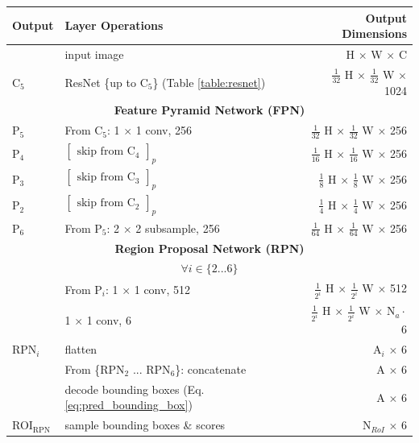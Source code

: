 {
\begin{table}[h]
\centering
\begin{tabular}{llr}
\toprule
\textbf{Output} & \textbf{Layer Operations} & \textbf{Output Dimensions} \\
\midrule\midrule
& input image & H $\times$ W $\times$ C \\
\midrule
C$_5$ & ResNet \{up to C$_5$\} (Table \ref{table:resnet})  & $\tfrac{1}{32}$ H $\times$ $\tfrac{1}{32}$ W $\times$ 1024 \\
\midrule
\multicolumn{3}{c}{\textbf{Feature Pyramid Network (FPN)}}\\
\midrule
P$_5$ & From C$_5$: 1 $\times$ 1 conv, 256 & $\tfrac{1}{32}$ H $\times$ $\tfrac{1}{32}$ W $\times$ 256 \\
P$_4$ & $\begin{bmatrix}\textrm{skip from C$_4$}\end{bmatrix}_p$ & $\tfrac{1}{16}$ H $\times$ $\tfrac{1}{16}$ W $\times$ 256 \\
P$_3$ & $\begin{bmatrix}\textrm{skip from C$_3$}\end{bmatrix}_p$ & $\tfrac{1}{8}$ H $\times$ $\tfrac{1}{8}$ W $\times$ 256 \\
P$_2$ & $\begin{bmatrix}\textrm{skip from C$_2$}\end{bmatrix}_p$ & $\tfrac{1}{4}$ H $\times$ $\tfrac{1}{4}$ W $\times$ 256 \\
P$_6$ & From P$_5$: 2 $\times$ 2 subsample, 256 & $\tfrac{1}{64}$ H $\times$ $\tfrac{1}{64}$ W $\times$ 256 \\
\midrule
\multicolumn{3}{c}{\textbf{Region Proposal Network (RPN)}}\\
\midrule
\multicolumn{3}{c}{$\forall i \in \{2...6\}$}\\
& From P$_i$: 1 $\times$ 1 conv, 512 & $\tfrac{1}{2^i}$ H $\times$ $\tfrac{1}{2^i}$ W $\times$ 512 \\
& 1 $\times$ 1 conv, 6 & $\tfrac{1}{2^i}$ H $\times$ $\tfrac{1}{2^i}$ W $\times$ $\text{N}_a \cdot$ 6 \\
RPN$_i$& flatten & A$_i$ $\times$ 6 \\
\midrule
& From \{RPN$_2$ ... RPN$_6$\}: concatenate & A $\times$ 6 \\
& decode bounding boxes (Eq. \ref{eq:pred_bounding_box}) & A $\times$ 6 \\
ROI$_{\mathrm{RPN}}$ & sample bounding boxes \& scores & N$_{RoI}$ $\times$ 6 \\

\end{tabular}
\end{table}}
